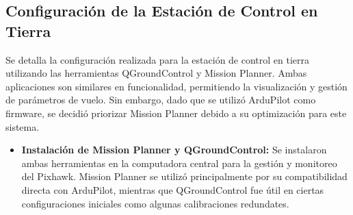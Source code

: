 \subsection{Configuración de la Estación de Control en Tierra} 
    Se detalla la configuración realizada para la estación de control en tierra utilizando las herramientas QGroundControl y Mission Planner. Ambas aplicaciones son similares en funcionalidad, permitiendo la visualización y gestión de parámetros de vuelo. Sin embargo, dado que se utilizó ArduPilot como firmware, se decidió priorizar Mission Planner debido a su optimización para este sistema.
    
    \begin{itemize}
        \item \textbf{Instalación de Mission Planner y QGroundControl:} 
        Se instalaron ambas herramientas en la computadora central para la gestión y monitoreo del Pixhawk. Mission Planner se utilizó principalmente por su compatibilidad directa con ArduPilot, mientras que QGroundControl fue útil en ciertas configuraciones iniciales como algunas calibraciones redundates.
    

\end{itemize}
